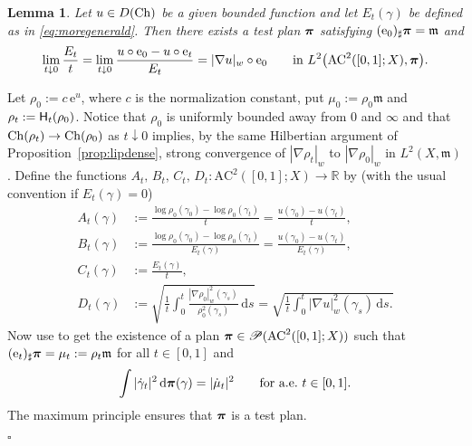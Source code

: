 \documentclass[reqno,11pt]{article}
\numberwithin{equation}{section}
\newcommand{\C}{\mathbb{C}}
\newcommand{\R}{\mathbb{R}}
\newcommand{\mm}{{\mbox{\boldmath$m$}}}
\newcommand{\ppi}{{\mbox{\boldmath$\pi$}}}
\newcommand{\rme}{{\mathrm e}}
\renewcommand{\d}{{\mathrm d}}
\newcommand{\Probabilities}[1]{\mathscr P(#1)}          %
\newenvironment{proof}{\removelastskip\par\medskip   %
\noindent{\em Proof.}
\rm}{\penalty-20\null\hfill$\square$\par\medbreak}
\newtheorem{lemma}[theorem]{Lemma}
\newcommand{\prob}{\Probabilities}
\newcommand{\e}{{\rm{e}}}                           %
\newcommand{\weakgrad}[1]{|\nabla #1|_w}                %
\renewcommand{\C}{{\rm Ch}}
\newcommand{\heatl}{{\sf H}}
\newcommand{\AC}[3]{\mathrm{AC}^{#1}(#2;#3)}
\renewcommand{\mm}{\mathfrak m}
\begin{document}
\begin{lemma}\label{le:planperu}
Let $u\in D(\C)$ be a given bounded function and let $E_t(\gamma)$
be defined as in \eqref{eq:moregenerald}. Then there exists a test
plan $\ppi$ satisfying $(\e_0)_\sharp\ppi=\mm$ and
\begin{equation}
\label{eq:plandiu} \lim_{t\downarrow
0}\frac{E_t}{t}=\lim_{t\downarrow 0}\frac{u\circ\e_0-u\circ
\e_t}{E_t}=\weakgrad u\circ\e_0\qquad\text{in
$L^2\bigl(\AC2{[0,1]}X ,\ppi\bigr)$.}
\end{equation}
\end{lemma}
\begin{proof}
Let $\rho_0:=c\,\rme^u$, where $c$ is the normalization constant, put
$\mu_0:=\rho_0\mm$ and $\rho_t:=\heatl_t(\rho_0)$. Notice that
$\rho_0$ is uniformly bounded away from 0 and $\infty$ and that
$\C(\rho_t)\to\C(\rho_0)$ as $t\downarrow 0$ implies, by the same
Hilbertian argument of Proposition~\ref{prop:lipdense}, strong convergence of
$\weakgrad{\rho_t}$ to $\weakgrad{\rho_0}$ in $L^2(X,\mm)$. Define
the functions $A_t,\,B_t,\,C_t,\,D_t:\AC2{[0,1]}X \to\R$ by (with
the usual convention if $E_t(\gamma)=0$)
\[
\begin{split}
A_t(\gamma)&:=\frac{\log\rho_0(\gamma_0)-\log\rho_0(\gamma_t)}{t}=\frac{u(\gamma_0)-u(\gamma_t)}t,\\
B_t(\gamma)&:=\frac{\log\rho_0(\gamma_0)-\log\rho_0(\gamma_t)}{E_t(\gamma)}=
\frac{u(\gamma_0)-u(\gamma_t)}{E_t(\gamma)},\\
C_t(\gamma)&:=\frac{E_t(\gamma)}{t},\\
D_t(\gamma)&:=\sqrt{\frac1t\int_0^t\frac{\weakgrad{\rho_0}^2(\gamma_s)}{\rho_0^2(\gamma_s)}\,\d
s}=\sqrt{\frac1t\int_0^t\weakgrad{u}^2(\gamma_s)\,\d s.}
\end{split}
\]
Now use \cite{Lisini07} to get the existence of a plan $\ppi\in
\prob{\AC2{[0,1]}X }$ such that $(\e_t)_\sharp\ppi=\mu_t:=\rho_t\mm$
for all $t\in [0,1]$ and
\[
\int|\dot\gamma_t|^2\,\d\ppi(\gamma)=|\dot\mu_t|^2\qquad\text{for
a.e.~$t\in [0,1]$.}
\]
The maximum principle ensures that $\ppi$ is a test plan.


\end{proof}
\end{document}
